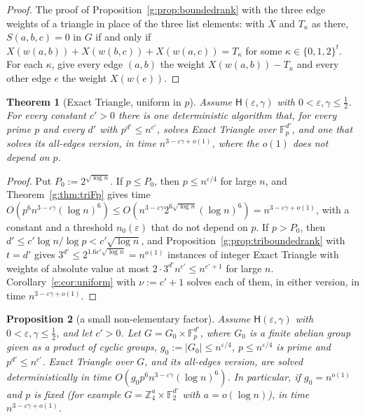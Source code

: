 \documentclass[11pt]{article}
\newtheorem{theorem}{Theorem}[section]
\newtheorem{proposition}[theorem]{Proposition}
\theoremstyle{definition}
\theoremstyle{remark}
\newcommand{\Z}{\mathbb{Z}}
\newcommand{\F}{\mathbb{F}_2}
\newcommand{\Fp}{\mathbb{F}_p}
\newcommand{\eps}{\varepsilon}
\newcommand{\Hyp}{\mathsf{H}}
\begin{document}
\begin{proof}
The proof of Proposition~\ref{g:prop:boundedrank} with the three edge weights of a triangle in place of the three list elements: with $X$ and $T_\kappa$ as there, $S(a,b,c)=0$ in $G$ if and only if $X(w(a,b))+X(w(b,c))+X(w(a,c))=T_\kappa$ for some $\kappa\in\{0,1,2\}^t$. For each $\kappa$, give every edge $(a,b)$ the weight $X(w(a,b))-T_\kappa$ and every other edge $e$ the weight $X(w(e))$.
\end{proof}

\begin{theorem}[Exact Triangle, uniform in $p$]\label{g:thm:triuniform}
Assume $\Hyp(\eps,\gamma)$ with $0<\eps,\gamma\le\frac12$. For every constant $c'>0$ there is one deterministic algorithm that, for every prime $p$ and every $d'$ with $p^{d'}\le n^{c'}$, solves Exact Triangle over $\Fp^{d'}$, and one that solves its all-edges version, in time $n^{3-\eps\gamma+o(1)}$, where the $o(1)$ does not depend on $p$.
\end{theorem}

\begin{proof}
Put $P_0:=2^{\sqrt{\log n}}$. If $p\le P_0$, then $p\le n^{\eps/4}$ for large $n$, and Theorem~\ref{g:thm:triFp} gives time $O(p^6n^{3-\eps\gamma}(\log n)^6)\le O(n^{3-\eps\gamma}2^{6\sqrt{\log n}}(\log n)^6)=n^{3-\eps\gamma+o(1)}$, with a constant and a threshold $n_0(\eps)$ that do not depend on $p$. If $p>P_0$, then $d'\le c'\log n/\log p<c'\sqrt{\log n}$, and Proposition~\ref{g:prop:triboundedrank} with $t=d'$ gives $3^{d'}\le2^{1.6c'\sqrt{\log n}}=n^{o(1)}$ instances of integer Exact Triangle with weights of absolute value at most $2\cdot3^{d'}n^{c'}\le n^{c'+1}$ for large $n$. Corollary~\ref{e:cor:uniform} with $\nu:=c'+1$ solves each of them, in either version, in time $n^{3-\eps\gamma+o(1)}$.
\end{proof}

\begin{proposition}[a small non-elementary factor]\label{g:prop:trismall}
Assume $\Hyp(\eps,\gamma)$ with $0<\eps,\gamma\le\frac12$, and let $c'>0$. Let $G=G_0\times\Fp^{d'}$, where $G_0$ is a finite abelian group given as a product of cyclic groups, $g_0:=|G_0|\le n^{\eps/4}$, $p\le n^{\eps/4}$ is prime and $p^{d'}\le n^{c'}$. Exact Triangle over $G$, and its all-edges version, are solved deterministically in time $O(g_0p^6n^{3-\eps\gamma}(\log n)^6)$. In particular, if $g_0=n^{o(1)}$ and $p$ is fixed (for example $G=\Z_4^a\times\F^{d'}$ with $a=o(\log n)$), in time $n^{3-\eps\gamma+o(1)}$.
\end{proposition}
\end{document}
